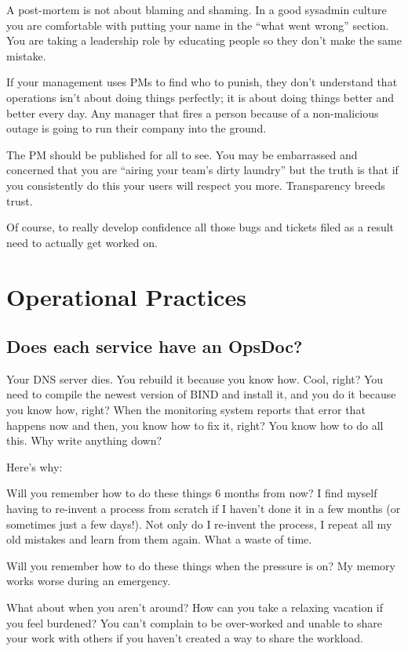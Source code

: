 \documentclass{article}
\begin{document}
A post-mortem is not about blaming and shaming. In a good sysadmin culture you are comfortable with putting your name in the ``what went wrong'' section. You are taking a leadership role by educating people so they don't make the same mistake.

If your management uses PMs to find who to punish, they don't understand that operations isn't about doing things perfectly; it is about doing things better and better every day. Any manager that fires a person because of a non-malicious outage is going to run their company into the ground.

The PM should be published for all to see. You may be embarrassed and concerned that you are ``airing your team's dirty laundry'' but the truth is that if you consistently do this your users will respect you more. Transparency breeds trust.

Of course, to really develop confidence all those bugs and tickets filed as a result need to actually get worked on.

\section{Operational Practices}
\subsection{Does each service have an OpsDoc?}
Your DNS server dies. You rebuild it because you know how. Cool, right? You need to compile the newest version of BIND and install it, and you do it because you know how, right? When the monitoring system reports that error that happens now and then, you know how to fix it, right? You know how to do all this. Why write anything down?

Here's why:

Will you remember how to do these things 6 months from now? I find myself having to re-invent a process from scratch if I haven't done it in a few months (or sometimes just a few days!). Not only do I re-invent the process, I repeat all my old mistakes and learn from them again. What a waste of time.

Will you remember how to do these things when the pressure is on? My memory works worse during an emergency.

What about when you aren't around? How can you take a relaxing vacation if you feel burdened? You can't complain to be over-worked and unable to share your work with others if you haven't created a way to share the workload.
\end{document}

